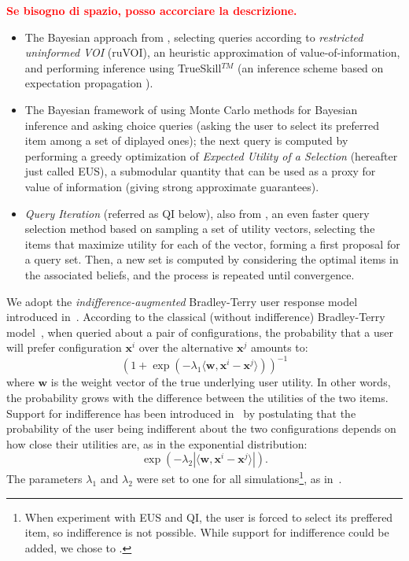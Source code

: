 \documentclass{article}
\renewcommand\[{\begin{equation}}
\renewcommand\]{\end{equation}}
\newcommand{\vecvar}[1]{\ensuremath{\boldsymbol{#1}}}
\newcommand{\vw}{\vecvar{w}}
\newcommand{\vx}{\vecvar{x}}
\newcommand{\paolo}[1]{{\bf \textcolor{red}{{\fbox{Paolo:} #1}}}}
\begin{document}
\paolo{Se bisogno di spazio, posso accorciare la descrizione.}
\begin{itemize}
 \item The Bayesian approach from \cite{guo2010real}, selecting queries according to {\em restricted uninformed VOI} (ruVOI), an heuristic approximation of value-of-information, and performing inference using  TrueSkill$^{TM}$ \cite{HerbrichMG06} (an inference scheme based on expectation propagation \cite{Minka01}).
 
 \item The Bayesian framework of \cite{viappiani2010optimal} using Monte Carlo methods for Bayesian inference and asking choice queries (asking the user to select its preferred item among a set of diplayed ones); the next query is computed by performing a greedy optimization of {\em Expected Utility of a Selection} (hereafter just called EUS), a submodular quantity that can be used as a proxy for value of information (giving strong approximate guarantees).
 
 \item {\em Query Iteration} (referred as QI below), also from \cite{viappiani2010optimal}, an even faster query selection method based on sampling a set of utility vectors, selecting the items that maximize utility for each of the vector, forming a first proposal for a query set. Then, a new set is computed by considering the optimal items in the associated  beliefs, and the process is repeated until convergence.
\end{itemize}


We adopt the {\em indifference-augmented} Bradley-Terry user response
model introduced in~\cite{guo2010real}. According to the classical
(without indifference) Bradley-Terry model~\cite{BraTer52}, when queried about a pair
of configurations, the probability that a user will prefer
configuration $\vx^i$ over the alternative $\vx^j$ amounts to:
%
$$ (1 + \exp(-\lambda_1 \langle\vw,\vx^i - \vx^j\rangle))^{-1} $$
%
where $\vw$ is the weight vector of the true underlying user utility.
In other words, the probability grows with the difference between the
utilities of the two items. Support for indifference has been
introduced in~\cite{guo2010real} by postulating that the probability
of the user being indifferent about the two configurations depends on
how close their utilities are, as in the exponential distribution:
%
$$ \exp(-\lambda_2 |\langle\vw,\vx^i - \vx^j\rangle|). $$
%
The parameters $\lambda_1$ and $\lambda_2$ were set to one for all
simulations\footnote{When experiment with EUS and QI, the user is forced to select
its preffered item, so indifference is not possible. While support for indifference
could be added, we chose to .}, as in~\cite{guo2010real}.
\end{document}
